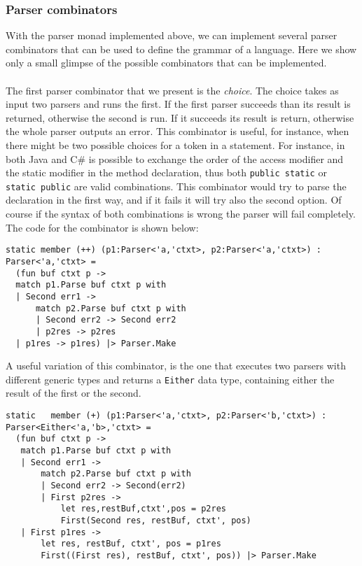 \subsubsection{Parser combinators}
With the parser monad implemented above, we can implement several parser combinators that can be used to define the grammar of a language. Here we show only a small glimpse of the possible combinators that can be implemented.\\\\
The first parser combinator that we present is the \textit{choice}. The choice takes as input two parsers and runs the first. If the first parser succeeds than its result is returned, otherwise the second is run. If it succeeds its result is return, otherwise the whole parser outputs an error. This combinator is useful, for instance, when there might be two possible choices for a token in a statement. For instance, in both Java and C\# is possible to exchange the order of the access modifier and the static modifier in the method declaration, thus both \texttt{public static} or \texttt{static public} are valid combinations. This combinator would try to parse the declaration in the first way, and if it fails it will try also the second option. Of course if the syntax of both combinations is wrong the parser will fail completely. The code for the combinator is shown below:

\begin{lstlisting}
static member (++) (p1:Parser<'a,'ctxt>, p2:Parser<'a,'ctxt>) : Parser<'a,'ctxt> = 
  (fun buf ctxt p ->
  match p1.Parse buf ctxt p with
  | Second err1 ->
      match p2.Parse buf ctxt p with
      | Second err2 -> Second err2
      | p2res -> p2res
  | p1res -> p1res) |> Parser.Make
\end{lstlisting}

\noindent
A useful variation of this combinator, is the one that executes two parsers with different generic types and returns a \texttt{Either} data type, containing either the result of the first or the second.
\begin{lstlisting}
static   member (+) (p1:Parser<'a,'ctxt>, p2:Parser<'b,'ctxt>) : Parser<Either<'a,'b>,'ctxt> = 
  (fun buf ctxt p ->
   match p1.Parse buf ctxt p with
   | Second err1 ->
       match p2.Parse buf ctxt p with
       | Second err2 -> Second(err2)
       | First p2res -> 
           let res,restBuf,ctxt',pos = p2res 
           First(Second res, restBuf, ctxt', pos)
   | First p1res ->
       let res, restBuf, ctxt', pos = p1res
       First((First res), restBuf, ctxt', pos)) |> Parser.Make
\end{lstlisting}

